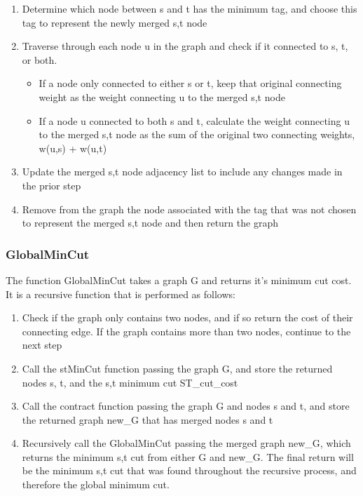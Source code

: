     \begin{enumerate}
        \item Determine which node between s and t has the minimum tag, and choose this tag to represent the newly merged s,t node
        \item Traverse through each node u in the graph and check if it connected to s, t, or both.
            \begin{itemize}
            \item If a node only connected to either s or t, keep that original connecting weight as the weight connecting u to the merged s,t node
            \item If a node u connected to both s and t, calculate the weight connecting u to the merged s,t node as the sum of the original two connecting weights, w(u,s) + w(u,t)
            \end{itemize}
        \item Update the merged s,t node adjacency list to include any changes made in the prior step
        \item Remove from the graph the node associated with the tag that was not chosen to represent the merged s,t node and then return the graph
     
    \end{enumerate}

\subsubsection{GlobalMinCut}  
The function GlobalMinCut takes a graph G and returns it's minimum cut cost. It is a recursive function that is performed as follows:
\begin{enumerate}

    \item Check if the graph only contains two nodes, and if so return the cost of their connecting edge. If the graph contains more than two nodes, continue to the next step
    \item Call the stMinCut function passing the graph G, and store the returned nodes s, t, and the s,t minimum cut ST{\_}cut{\_}cost
    \item Call the contract function passing the graph G and nodes s and t, and store the returned graph new{\_}G that has merged nodes s and t
    \item Recursively call the GlobalMinCut passing the merged graph new{\_}G, which returns the minimum s,t cut from either G and new{\_}G. The final return will be the minimum s,t cut that was found throughout the recursive process, and therefore the global minimum cut. 

\end{enumerate}

